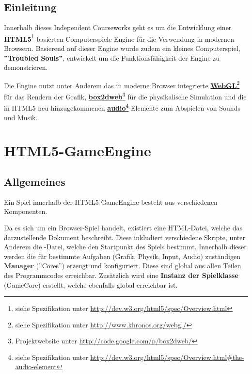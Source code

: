
\chapter*{Einleitung}

Innerhalb dieses Independent Courseworks geht es um die Entwicklung einer \textbf{\href{http://dev.w3.org/html5/spec/Overview.html}{HTML5}}\footnote{siehe Spezifikation unter \url{http://dev.w3.org/html5/spec/Overview.html}}-basierten Computerspiele-Engine für die Verwendung in modernen Browsern. Basierend auf dieser Engine wurde zudem ein kleines Computerspiel, \textbf{''Troubled Souls''}, entwickelt um die Funktionsfähigkeit der Engine zu demonstrieren.

Die Engine nutzt unter Anderem das in moderne Browser integrierte \textbf{\href{http://www.khronos.org/webgl/}{WebGL}}\footnote{siehe Spezifikation unter \url{http://www.khronos.org/webgl/}} für das Rendern der Grafik, \textbf{\href{http://code.google.com/p/box2dweb/}{box2dweb}}\footnote{Projektwebsite unter \url{http://code.google.com/p/box2dweb/}} für die physikalische Simulation und die in HTML5 neu hinzugekommenen \textbf{\href{http://dev.w3.org/html5/spec/Overview.html\#the-audio-element}{audio}}\footnote{siehe Spezifikation unter \url{http://dev.w3.org/html5/spec/Overview.html\#the-audio-element}}-Elemente zum Abspielen von Sounds und Musik.

\part{HTML5-GameEngine}

\chapter*{Allgemeines}

Ein Spiel innerhalb der HTML5-GameEngine besteht aus verschiedenen Komponenten.

Da es sich um ein Browser-Spiel handelt, existiert eine HTML-Datei, welche das darzustellende Dokument beschreibt. Diese inkludiert verschiedene Skripte, unter Anderem die -Datei, welche den Startpunkt des Spiels bestimmt. Innerhalb dieser werden die für bestimmte Aufgaben (Grafik, Physik, Input, Audio) zuständigen \textbf{Manager} (''Cores'') erzeugt und konfiguriert. Diese sind global aus allen Teilen des Programmcodes erreichbar. Zusätzlich wird eine \textbf{Instanz der Spielklasse} (GameCore) erstellt, welche ebenfalls global erreichbar ist.

